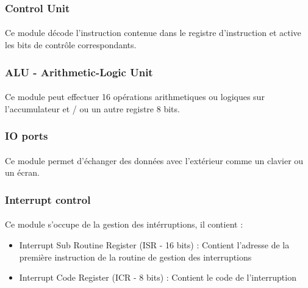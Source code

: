 \documentclass{article}
\begin{document}
    \subsubsection{Control Unit}
    \paragraph{}
    Ce module décode l'instruction contenue dans le registre d'instruction et active les bits de contrôle 
    correspondants.

    \subsubsection{ALU - Arithmetic-Logic Unit}
    \paragraph{}
    Ce module peut effectuer 16 opérations arithmetiques ou logiques sur l'accumulateur et / ou
    un autre registre 8 bits.

    \subsubsection{IO ports}
    \paragraph{}
    Ce module permet d'échanger des données avec l'extérieur comme un clavier ou un écran.
    
    \subsubsection{Interrupt control}
    \paragraph{}
    Ce module s'occupe de la gestion des intérruptions, il contient :
    
    \begin{itemize}
        \item Interrupt Sub Routine Register (ISR - 16 bits) : Contient l'adresse de la première instruction
        de la routine de gestion des interruptions 
        \item Interrupt Code Register (ICR - 8 bits) : Contient le code de l'interruption
    \end{itemize}

    \paragraph{}
\end{document}

